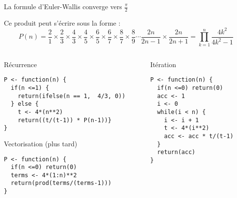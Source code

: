 \documentclass[10pt]{beamer}
\begin{document}
 \questionSlide

 \appendix
 \backupSlides

 \begin{frame}[fragile]{La formule d'Euler-Wallis converge vers $\frac{\pi}{2}$}

   Ce produit peut s'écrire sous la forme :
    $$
    P(n) = {\frac {2}{1}}\times {\frac {2}{3}}\times {\frac {4}{3}}\times {\frac {4}{5}}\times {\frac {6}{5}}\times {\frac {6}{7}}\times {\frac {8}{7}}\times {\frac {8}{9}}\cdots {\frac {2n}{2n-1}}\times {\frac {2n}{2n+1}}
    = \prod_{k=1}^n \frac{4k^2}{4k^2-1}
    $$
    \vspace{-10pt}
    \begin{columns}[t]
      \begin{column}{0.59\textwidth}
  \begin{block}{Récurrence}
    \begin{lstlisting}[style=edblock]
P <- function(n) {
  if(n <=1) {
    return(ifelse(n == 1,  4/3, 0))
  } else {
    t <- 4*(n**2)
    return((t/(t-1)) * P(n-1))}
}
\end{lstlisting}
\end{block}
\begin{block}{Vectorisation (plus tard)}
    \begin{lstlisting}[style=edblock]
P <- function(n) {
  if(n <=0) return(0)
  terms <- 4*(1:n)**2
  return(prod(terms/(terms-1)))
}
\end{lstlisting}
  \end{block}

\end{column}
\begin{column}{0.41\textwidth}
  \begin{block}{Itération}
    \begin{lstlisting}[style=edblock]
P <- function(n) {
  if(n <=0) return(0)
  acc <- 1
  i <- 0
  while(i < n) {
    i <- i + 1
    t <- 4*(i**2)
    acc <- acc * t/(t-1)
  }
  return(acc)
}
\end{lstlisting}
  \end{block}
\end{column}
\end{columns}

\end{frame}
\end{document}
